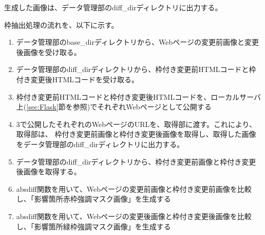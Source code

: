 \par
生成した画像は、データ管理部のdiff\_dirディレクトリに出力する。
\par
枠抽出処理の流れを、以下に示す。
\begin{enumerate}
    \item データ管理部のbase\_dirディレクトリから、Webページの変更前画像と変更後画像を受け取る。
    \item データ管理部のdiff\_dirディレクトリから、枠付き変更前HTMLコードと枠付き変更後HTMLコードを受け取る。
    \item 枠付き変更前HTMLコードと枠付き変更後HTMLコードを、ローカルサーバ上(\ref{sec:Flask}節を参照)でそれぞれWebページとして公開する
    \item 3で公開したそれぞれのWebページのURLを、取得部に渡す。これにより、取得部は、
          枠付き変更前画像と枠付き変更後画像を取得し、取得した画像をデータ管理部のdiff\_dirディレクトリに出力する。
    \item データ管理部のdiff\_dirディレクトリから、枠付き変更前画像と枠付き変更後画像を取得する。
    \item absdiff関数を用いて、Webページの変更前画像と枠付き変更前画像を比較し、「影響箇所赤枠強調マスク画像」を生成する
    \item absdiff関数を用いて、Webページの変更後画像と枠付き変更後画像を比較し、「影響箇所緑枠強調マスク画像」を生成する
\end{enumerate}

